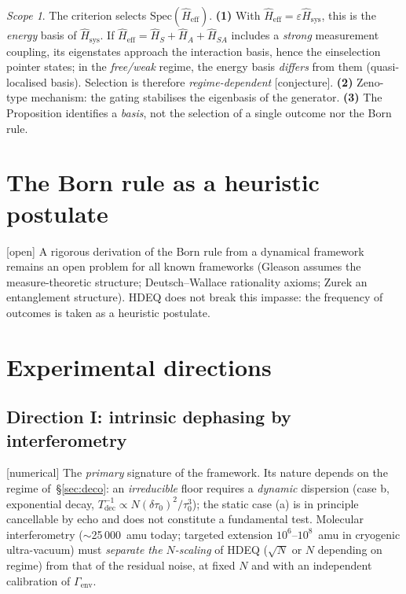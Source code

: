 \documentclass[11pt,a4paper]{article}
\newcommand{\Hsysop}{\hat{H}_{\mathrm{sys}}}
\newcommand{\Heff}{\hat{H}_{\mathrm{eff}}}
\newcommand{\statut}[1]{{\footnotesize\textsf{[#1]}}}
\theoremstyle{plain}
\theoremstyle{definition}
\theoremstyle{remark}
\newtheorem*{scope}{Scope}
\begin{document}
\begin{scope}
The criterion selects $\mathrm{Spec}(\Heff)$. \textbf{(1)} With
$\Heff=\varepsilon\Hsysop$, this is the \emph{energy} basis of $\Hsysop$. If
$\Heff=\hat H_S+\hat H_A+\hat H_{SA}$ includes a \emph{strong} measurement
coupling, its eigenstates approach the interaction basis, hence the einselection
pointer states; in the \emph{free/weak} regime, the energy basis \emph{differs}
from them (quasi-localised basis). Selection is therefore \emph{regime-dependent}
\statut{conjecture}. \textbf{(2)} Zeno-type mechanism: the gating stabilises the
eigenbasis of the generator. \textbf{(3)} The Proposition identifies a
\emph{basis}, not the selection of a single outcome nor the Born rule.
\end{scope}

\section{The Born rule as a heuristic postulate}
\statut{open} A rigorous derivation of the Born rule from a dynamical framework
remains an open problem for all known frameworks (Gleason assumes the
measure-theoretic structure; Deutsch--Wallace rationality axioms; Zurek an
entanglement structure). HDEQ does not break this impasse: the frequency of
outcomes is taken as a heuristic postulate.

\section{Experimental directions}\label{sec:exp}
\subsection{Direction I: intrinsic dephasing by interferometry}
\statut{numerical} The \emph{primary} signature of the framework. Its nature
depends on the regime of~\S\ref{sec:deco}: an \emph{irreducible} floor requires a
\emph{dynamic} dispersion (case b, exponential decay, $T_{\mathrm{dec}}^{-1}\propto
N(\delta\tau_0)^2/\tau_0^3$); the static case (a) is in principle cancellable by
echo and does not constitute a fundamental test. Molecular interferometry
($\sim$25\,000~amu today; targeted extension $10^6$--$10^8$~amu in cryogenic
ultra-vacuum) must \emph{separate the $N$-scaling} of HDEQ ($\sqrt N$ or $N$
depending on regime) from that of the residual noise, at fixed $N$ and with an
independent calibration of $\Gamma_{\mathrm{env}}$.
\end{document}
